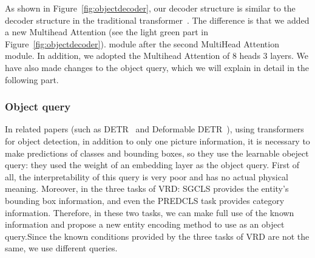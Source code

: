As shown in Figure~\ref{fig:objectdecoder}, our decoder structure is similar to the decoder structure in the traditional transformer~\cite{vaswani2017attention}. The difference is that we added a new Multihead Attention  (see the light green part in  Figure~\ref{fig:objectdecoder}). module after the second MultiHead Attention module. In addition, we adopted the Multihead Attention of 8 heads 3 layers. We have also made changes to the object query, which we will explain in detail in the following part.







\subsubsection{Object query}
In related papers (such as DETR~\cite{carion2020end} and Deformable DETR~\cite{zhu2021deformable}), using transformers for object detection, in addition to only one picture information, it is necessary to make predictions of classes and bounding boxes, so they use the learnable obeject query: they used the weight of an embedding layer as the object query. First of all, the interpretability of this query is very poor and has no actual physical meaning. Moreover, in the three tasks of VRD: SGCLS provides the entity's bounding box information, and even the PREDCLS task provides category information. Therefore, in these two tasks, we can make full use of the known information and propose a new entity encoding method to use as an object query.Since the known conditions provided by the three tasks of VRD are not the same, we use different queries.


